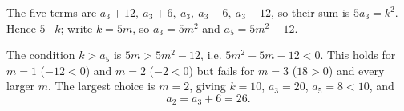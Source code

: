 The five terms are $a_3+12,\ a_3+6,\ a_3,\ a_3-6,\ a_3-12$, so their sum is $5a_3=k^2$. Hence $5\mid k$; write $k=5m$, so $a_3=5m^2$ and $a_5=5m^2-12$.

The condition $k>a_5$ is $5m>5m^2-12$, i.e. $5m^2-5m-12<0$. This holds for $m=1$ ($-12<0$) and $m=2$ ($-2<0$) but fails for $m=3$ ($18>0$) and every larger $m$. The largest choice is $m=2$, giving $k=10$, $a_3=20$, $a_5=8<10$, and
\[
a_2=a_3+6=\boxed{26}.
\]
